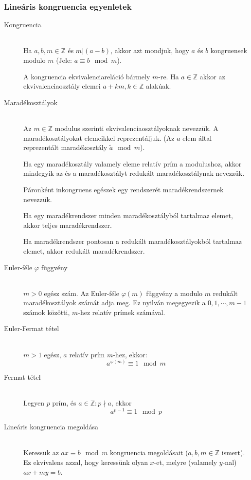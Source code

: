 \documentclass[margin=0px]{article}
\newcommand{\Z}{\mathbb{Z}}
\begin{document}
			\subsubsection{Lineáris kongruencia egyenletek}
				\begin{description}
					\item[Kongruencia] \hfill \\
						Ha $a,b,m \in\Z$ és $m|(a-b)$, akkor azt mondjuk, hogy $a$ és $b$ kongruensek modulo $m$ (Jele: ${a \equiv b \mod{m}}$).
						
						A kongruencia ekvivalenciareláció bármely $m$-re. Ha $a\in\Z$ akkor az ekvivalenciaosztály elemei $a+km, k\in\Z$ alakúak.
					\item[Maradékosztályok] \hfill \\
						Az $m\in\Z$ modulus szerinti ekvivalenciaosztályoknak nevezzük. A maradékosztályokat elemeikkel reprezentáljuk. (Az $a$ elem által reprezentált maradékosztály $\widetilde{a} \mod{m}$).
						
						Ha egy maradékosztály valamely eleme relatív prím a modulushoz, akkor mindegyik az és a maradékosztályt redukált maradékosztálynak nevezzük.
						
						Páronként inkongruens egészek egy rendszerét maradékrendszernek nevezzük. 
						
						Ha egy maradékrendszer minden maradékosztályból tartalmaz elemet, akkor teljes maradékrendszer.
						
						Ha maradékrendszer pontosan a redukált maradékosztályokból tartalmaz elemet, akkor redukált maradékrendszer.
					\item[Euler-féle $\varphi$ függvény] \hfill \\
						$m > 0$ egész szám. Az Euler-féle $\varphi(m)$ függvény a modulo $m$ redukált maradékosztályok számát adja meg. Ez nyilván megegyezik a $0,1,\cdots,m-1$ számok közötti, $m$-hez relatív prímek számával.
					\item[Euler-Fermat tétel] \hfill \\
						$m>1$ egész, $a$ relatív prím $m$-hez, ekkor:
							\[a^{\varphi(m)}\equiv 1 \mod{m}\]
					\item[Fermat tétel] \hfill \\
						Legyen $p$ prím, és $a\in\Z: p\nmid a$, ekkor
						\[a^{p-1}\equiv 1 \mod p \]
					\item[Lineáris kongruencia megoldása] \hfill \\
						Keressük az $ax \equiv b \mod{m}$ kongruencia megoldásait ($a,b,m\in\Z$ ismert). Ez ekvivalens azzal, hogy keressünk olyan $x$-et, melyre (valamely $y$-nal) $ax+my = b$.
						

\end{description}
\end{document}
